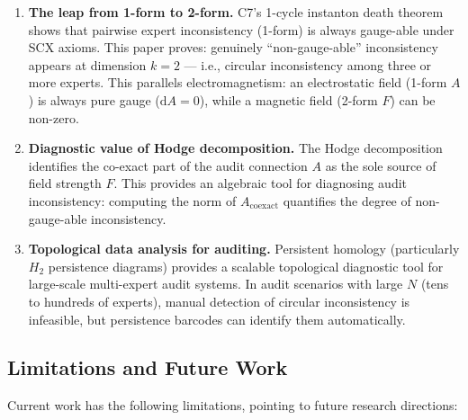 \documentclass[12pt,a4paper]{article}
\theoremstyle{plain}
\theoremstyle{definition}
\theoremstyle{remark}
\newcommand{\dd}{\mathrm{d}}
\begin{document}
\begin{enumerate}[label=(\arabic*), leftmargin=*]
    \item \textbf{The leap from 1-form to 2-form.} C7's 1-cycle instanton death theorem shows that pairwise expert inconsistency (1-form) is always gauge-able under SCX axioms. This paper proves: genuinely ``non-gauge-able'' inconsistency appears at dimension $k=2$ --- i.e., circular inconsistency among three or more experts. This parallels electromagnetism: an electrostatic field (1-form $A$) is always pure gauge ($\dd A = 0$), while a magnetic field (2-form $F$) can be non-zero.
    \item \textbf{Diagnostic value of Hodge decomposition.} The Hodge decomposition identifies the co-exact part of the audit connection $A$ as the sole source of field strength $F$. This provides an algebraic tool for diagnosing audit inconsistency: computing the norm of $A_{\mathrm{coexact}}$ quantifies the degree of non-gauge-able inconsistency.
    \item \textbf{Topological data analysis for auditing.} Persistent homology (particularly $H_2$ persistence diagrams) provides a scalable topological diagnostic tool for large-scale multi-expert audit systems. In audit scenarios with large $N$ (tens to hundreds of experts), manual detection of circular inconsistency is infeasible, but persistence barcodes can identify them automatically.
\end{enumerate}

\subsection{Limitations and Future Work}
\label{sec:limitations}

Current work has the following limitations, pointing to future research directions:
\end{document}
